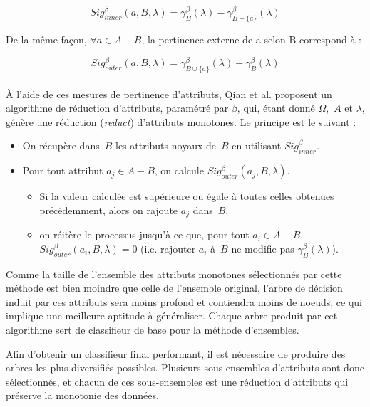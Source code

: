 \documentclass[a4paper]{article}
\begin{document}
$$ Sig^{\beta}_{inner}(a, B, \lambda) = \gamma^{\beta}_B(\lambda) -
\gamma^{\beta}_{B-\{a\}}(\lambda)$$

\noindent De la même façon, $\forall a \in A-B$, la pertinence externe de a selon B
correspond à :

$$ Sig^{\beta}_{outer}(a, B, \lambda) = \gamma^{\beta}_{B \cup \{a\}}(\lambda) -
\gamma^{\beta}_B(\lambda)$$ \\

À l'aide de ces mesures de pertinence d'attributs, Qian et al. proposent un
algorithme de réduction d'attributs, paramétré par $\beta$, qui, étant donné
$\Omega$,~$A$ et $\lambda$, génère une réduction (\emph{reduct}) d'attributs
monotones. Le principe est le suivant :

\begin{itemize}
    \item On récupère dans~$B$ les attributs noyaux de~$B$ en utilisant
        $Sig^{\beta}_{inner}$.
    \item Pour tout attribut $a_j \in A-B$, on calcule $Sig^{\beta}_{outer}(a_j,
        B, \lambda)$. 
    \begin{itemize}
        \item Si la valeur calculée est supérieure ou égale à toutes celles obtenues
            précédemment, alors on rajoute $a_j$ dans~$B$.
        \item on réitère le processus jusqu'à ce que, pour tout $a_i \in A-B$,
            $Sig^{\beta}_{outer}(a_i, B, \lambda) = 0$ (i.e. rajouter $a_i$
            à~$B$ ne modifie pas $\gamma^{\beta}_{B}(\lambda)$).
    \end{itemize}
\end{itemize}

\noindent Comme la taille de l'ensemble des attributs monotones sélectionnés par cette
méthode est bien moindre que celle de l'ensemble original, l'arbre de décision
induit par ces attributs sera moins profond et contiendra moins de noeuds, ce
qui implique une meilleure aptitude à généraliser. Chaque arbre produit par cet
algorithme sert de classifieur de base pour la méthode d'ensembles.

Afin d'obtenir un classifieur final performant, il est nécessaire de produire
des arbres les plus diversifiés possibles. Plusieurs sous-ensembles d'attributs
sont donc sélectionnés, et chacun de ces sous-ensembles est une réduction d'attributs
qui préserve la monotonie des données. 
\end{document}
